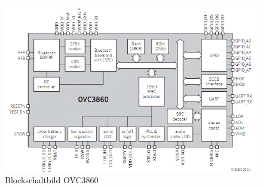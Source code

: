 \begin{figure} [H]
	\centering
	\includegraphics[width=1\textwidth]{img/BTModul/blockschaltbild.png}
	\caption[Blockschaltbild OVC3860]{Blockschaltbild OVC3860\footnotemark}\label {fig:3.3.1}
\end{figure}

\newpage
